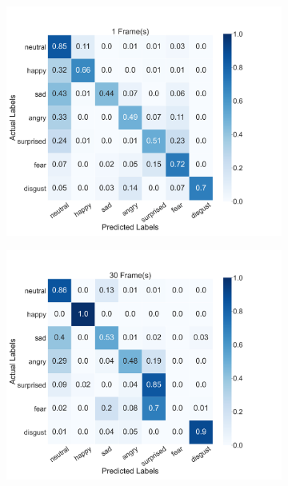 \begin{figure}
    \centering
    \begin{subfigure}[b]{0.45\textwidth}
      \includegraphics[width=\textwidth]{res/conf_fusion_1.png}
    \end{subfigure}
    \begin{subfigure}[b]{0.45\textwidth}
      \includegraphics[width=\textwidth]{res/conf_fusion_30.png}
    \end{subfigure}
    \begin{subfigure}[b]{0.45\textwidth}

\end{subfigure}
\end{figure}
